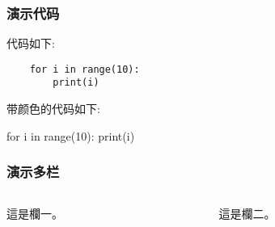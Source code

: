 \documentclass[xcolor=dvipsnames]{beamer}
\begin{document}
\begin{frame}[fragile]
    \frametitle{演示代码}
    代码如下:
    \begin{verbatim} 
    for i in range(10): 
        print(i)
    \end{verbatim}
    带颜色的代码如下:
    \begin{semiverbatim} 
    for \alert{i} in range(10): 
        print(\alert{i})
    \end{semiverbatim} 
\end{frame}


\begin{frame}
    \frametitle{演示多栏}
    \begin{columns} 
        \begin{column}{5cm} 
            這是欄一。 
        \end{column}

        \begin{column}{5cm} 
            這是欄二。 
        \end{column}
    \end{columns}
\end{frame}
\end{document}

